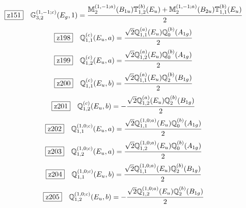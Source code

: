 \documentclass[fleqn,10pt,landscape]{jsarticle}
\begin{document}
\begin{dmath*}
\hspace*{3mm}\fbox{z151}\quad \mathbb{G}_{3,2}^{(1,-1;c)}(E_{g},1)=\frac{\mathbb{M}_{2}^{(1,-1;a)}(B_{1u}) \mathbb{T}_{1,2}^{(b)}(E_{u}) + \mathbb{M}_{2}^{(1,-1;a)}(B_{2u}) \mathbb{T}_{1,1}^{(b)}(E_{u})}{2}
\end{dmath*}
\begin{dmath*}
\hspace*{3mm}\fbox{z198}\quad \mathbb{Q}_{1,1}^{(c)}(E_{u},a)=\frac{\sqrt{2} \mathbb{Q}_{1,1}^{(a)}(E_{u}) \mathbb{Q}_{0}^{(b)}(A_{1g})}{2}
\end{dmath*}
\begin{dmath*}
\hspace*{3mm}\fbox{z199}\quad \mathbb{Q}_{1,2}^{(c)}(E_{u},a)=\frac{\sqrt{2} \mathbb{Q}_{1,2}^{(a)}(E_{u}) \mathbb{Q}_{0}^{(b)}(A_{1g})}{2}
\end{dmath*}
\begin{dmath*}
\hspace*{3mm}\fbox{z200}\quad \mathbb{Q}_{1,1}^{(c)}(E_{u},b)=\frac{\sqrt{2} \mathbb{Q}_{1,1}^{(a)}(E_{u}) \mathbb{Q}_{2}^{(b)}(B_{1g})}{2}
\end{dmath*}
\begin{dmath*}
\hspace*{3mm}\fbox{z201}\quad \mathbb{Q}_{1,2}^{(c)}(E_{u},b)=- \frac{\sqrt{2} \mathbb{Q}_{1,2}^{(a)}(E_{u}) \mathbb{Q}_{2}^{(b)}(B_{1g})}{2}
\end{dmath*}
\begin{dmath*}
\hspace*{3mm}\fbox{z202}\quad \mathbb{Q}_{1,1}^{(1,0;c)}(E_{u},a)=\frac{\sqrt{2} \mathbb{Q}_{1,1}^{(1,0;a)}(E_{u}) \mathbb{Q}_{0}^{(b)}(A_{1g})}{2}
\end{dmath*}
\begin{dmath*}
\hspace*{3mm}\fbox{z203}\quad \mathbb{Q}_{1,2}^{(1,0;c)}(E_{u},a)=\frac{\sqrt{2} \mathbb{Q}_{1,2}^{(1,0;a)}(E_{u}) \mathbb{Q}_{0}^{(b)}(A_{1g})}{2}
\end{dmath*}
\begin{dmath*}
\hspace*{3mm}\fbox{z204}\quad \mathbb{Q}_{1,1}^{(1,0;c)}(E_{u},b)=\frac{\sqrt{2} \mathbb{Q}_{1,1}^{(1,0;a)}(E_{u}) \mathbb{Q}_{2}^{(b)}(B_{1g})}{2}
\end{dmath*}
\begin{dmath*}
\hspace*{3mm}\fbox{z205}\quad \mathbb{Q}_{1,2}^{(1,0;c)}(E_{u},b)=- \frac{\sqrt{2} \mathbb{Q}_{1,2}^{(1,0;a)}(E_{u}) \mathbb{Q}_{2}^{(b)}(B_{1g})}{2}
\end{dmath*}
\vspace{5mm}
\end{document}
